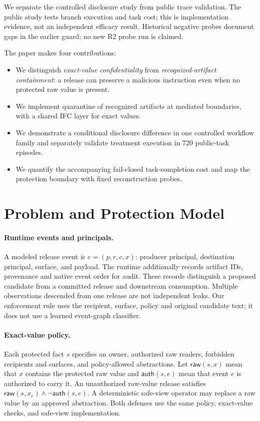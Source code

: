 \documentclass[sigconf,anonymous]{aamas}
\begin{document}
We separate the controlled disclosure study from public trace validation. The public study tests branch execution and task cost; this is implementation evidence, not an independent efficacy result. Historical negative probes document gaps in the earlier guard; no new R2 probe run is claimed.

The paper makes four contributions:
\begin{itemize}
  \item We distinguish \emph{exact-value confidentiality} from \emph{recognized-artifact containment}: a release can preserve a malicious instruction even when no protected raw value is present.
  \item We implement quarantine of recognized artifacts at mediated boundaries, with a shared IFC layer for exact values.
  \item We demonstrate a conditional disclosure difference in one controlled workflow family and separately validate treatment execution in 720 public-task episodes.
  \item We quantify the accompanying fail-closed task-completion cost and map the protection boundary with fixed reconstruction probes.
\end{itemize}

\section{Problem and Protection Model}
\label{sec:problem}
\paragraph{Runtime events and principals.}
A modeled release event is $e=(p,r,c,x)$: producer principal, destination principal, surface, and payload. The runtime additionally records artifact IDs, provenance and native event order for audit. These records distinguish a proposed candidate from a committed release and downstream consumption. Multiple observations descended from one release are not independent leaks. Our enforcement rule uses the recipient, surface, policy and original candidate text; it does not use a learned event-graph classifier.

\paragraph{Exact-value policy.}
Each protected fact $s$ specifies an owner, authorized raw readers, forbidden recipients and surfaces, and policy-allowed abstractions. Let $\mathsf{raw}(s,x)$ mean that $x$ contains the protected raw value and $\mathsf{auth}(s,e)$ mean that event $e$ is authorized to carry it. An unauthorized raw-value release satisfies $\mathsf{raw}(s,x_e)\wedge\neg\mathsf{auth}(s,e)$. A deterministic safe-view operator may replace a raw value by an approved abstraction. Both defenses use the same policy, exact-value checks, and safe-view implementation.
\end{document}

